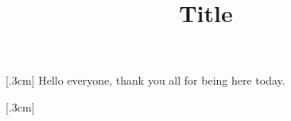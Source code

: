 \documentclass[12pt,letterpaper]{article}
\title{Title}
\date{}
\begin{document}
\maketitle

\marginnote[\slide]{}[.3cm]
Hello everyone, thank you all for being here today.

\marginnote[\slide]{}[.3cm]
\lipsum[1]
\end{document}
